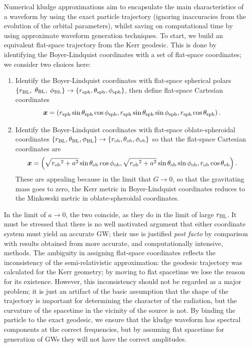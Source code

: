 Numerical kludge approximations aim to encapsulate the main characteristics of a waveform by using the exact particle trajectory (ignoring inaccuracies from the evolution of the orbital parameters), whilst saving on computational time by using approximate waveform generation techniques. To start, we build an equivalent flat-space trajectory from the Kerr geodesic. This is done by identifying the Boyer-Lindquist coordinates with a set of flat-space coordinates; we consider two choices here:
\begin{enumerate}
\item Identify the Boyer-Lindquist coordinates with flat-space spherical polars $\{r_\mathrm{BL},$ $\theta_\mathrm{BL},$ $\phi_\mathrm{BL}\} \rightarrow \{r_\mathrm{sph}, \theta_\mathrm{sph}, \phi_\mathrm{sph}\}$, then define flat-space Cartesian coordinates\cite{Gair2005, Babak2007}
\begin{equation}
\boldsymbol{x} = \left(r_\mathrm{sph} \sin\theta_\mathrm{sph}\cos\phi_\mathrm{sph}, r_\mathrm{sph} \sin\theta_\mathrm{sph}\sin\phi_\mathrm{sph}, r_\mathrm{sph} \cos\theta_\mathrm{sph}\right).
\end{equation}
\item Identify the Boyer-Lindquist coordinates with flat-space oblate-spheroidal coordinates $\{r_\mathrm{BL}, \theta_\mathrm{BL}, \phi_\mathrm{BL}\} \rightarrow \{r_\mathrm{ob}, \theta_\mathrm{ob}, \phi_\mathrm{ob}\}$ so that the flat-space Cartesian coordinates are
\begin{equation}
\boldsymbol{x} = \left(\sqrt{{r_\mathrm{ob}}^2 + a^2} \sin\theta_\mathrm{ob}\cos\phi_\mathrm{ob}, \sqrt{{r_\mathrm{ob}}^2 + a^2} \sin\theta_\mathrm{ob}\sin\phi_\mathrm{ob}, r_\mathrm{ob} \cos\theta_\mathrm{ob}\right).
\end{equation}
These are appealing because in the limit that $G \rightarrow 0$, so that the gravitating mass goes to zero, the Kerr metric in Boyer-Lindquist coordinates reduces to the Minkowski metric in oblate-spheroidal coordinates.%
\end{enumerate}
In the limit of $a \rightarrow 0$, the two coincide, as they do in the limit of large $r_\mathrm{BL}$. It must be stressed that there is no well motivated argument that either coordinate system must yield an accurate GW; their use is justified {\it post facto} by comparison with results obtained from more accurate, and computationally intensive, methods\cite{Gair2005, Babak2007}. The ambiguity in assigning flat-space coordinates reflects the inconsistency of the semi-relativistic approximation: the geodesic trajectory was calculated for the Kerr geometry; by moving to flat spacetime we lose the reason for its existence. However, this inconsistency should not be regarded as a major problem; it is just an artifact of the basic assumption that the shape of the trajectory is important for determining the character of the radiation, but the curvature of the spacetime in the vicinity of the source is not. By binding the particle to the exact geodesic, we ensure that the kludge waveform has spectral components at the correct frequencies, but by assuming flat spacetime for generation of GWs they will not have the correct amplitudes.

